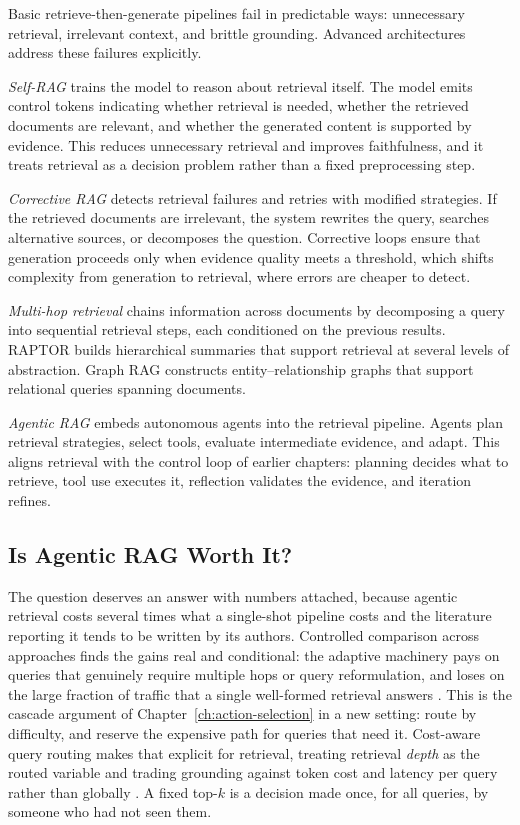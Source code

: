 \documentclass[11pt]{book}
\begin{document}
Basic retrieve-then-generate pipelines fail in predictable ways: unnecessary retrieval, irrelevant context, and brittle grounding. Advanced architectures address these failures explicitly.

\textit{Self-RAG} \cite{selfrag} trains the model to reason about retrieval itself. The model emits control tokens indicating whether retrieval is needed, whether the retrieved documents are relevant, and whether the generated content is supported by evidence. This reduces unnecessary retrieval and improves faithfulness, and it treats retrieval as a decision problem rather than a fixed preprocessing step.

\textit{Corrective RAG} \cite{crag} detects retrieval failures and retries with modified strategies. If the retrieved documents are irrelevant, the system rewrites the query, searches alternative sources, or decomposes the question. Corrective loops ensure that generation proceeds only when evidence quality meets a threshold, which shifts complexity from generation to retrieval, where errors are cheaper to detect.

\textit{Multi-hop retrieval} chains information across documents by decomposing a query into sequential retrieval steps, each conditioned on the previous results. RAPTOR \cite{raptor} builds hierarchical summaries that support retrieval at several levels of abstraction. Graph RAG \cite{graphrag} constructs entity--relationship graphs that support relational queries spanning documents.

\textit{Agentic RAG} \cite{agenticrag2025} embeds autonomous agents into the retrieval pipeline. Agents plan retrieval strategies, select tools, evaluate intermediate evidence, and adapt. This aligns retrieval with the control loop of earlier chapters: planning decides what to retrieve, tool use executes it, reflection validates the evidence, and iteration refines.

\subsection{Is Agentic RAG Worth It?}

The question deserves an answer with numbers attached, because agentic retrieval costs several times what a single-shot pipeline costs and the literature reporting it tends to be written by its authors. Controlled comparison across approaches finds the gains real and conditional: the adaptive machinery pays on queries that genuinely require multiple hops or query reformulation, and loses on the large fraction of traffic that a single well-formed retrieval answers \cite{isagenticrag2026}. This is the cascade argument of Chapter~\ref{ch:action-selection} in a new setting: route by difficulty, and reserve the expensive path for queries that need it. Cost-aware query routing makes that explicit for retrieval, treating retrieval \textit{depth} as the routed variable and trading grounding against token cost and latency per query rather than globally \cite{ragrouting2026}. A fixed top-$k$ is a decision made once, for all queries, by someone who had not seen them.
\end{document}
